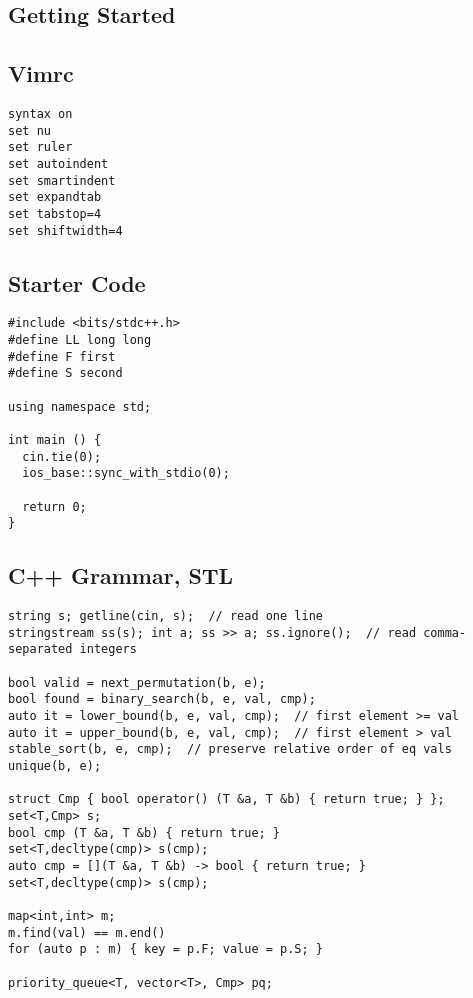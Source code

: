 \documentclass[10pt,landscape]{article}
\begin{document}
\begin{multicols}{2}

\setcounter{page}{1}
\pagestyle{fancy}
\tableofcontents
\newpage

\section{Getting Started}
\subsection{Vimrc}
\begin{lstlisting}
syntax on
set nu
set ruler
set autoindent
set smartindent
set expandtab
set tabstop=4
set shiftwidth=4
\end{lstlisting}
\subsection{Starter Code}
\begin{lstlisting}
#include <bits/stdc++.h>
#define LL long long
#define F first
#define S second

using namespace std;

int main () {
  cin.tie(0);
  ios_base::sync_with_stdio(0);
  
  return 0;
}
\end{lstlisting}
\subsection{C++ Grammar, STL}
\begin{lstlisting}
string s; getline(cin, s);  // read one line
stringstream ss(s); int a; ss >> a; ss.ignore();  // read comma-separated integers

bool valid = next_permutation(b, e);
bool found = binary_search(b, e, val, cmp);
auto it = lower_bound(b, e, val, cmp);  // first element >= val
auto it = upper_bound(b, e, val, cmp);  // first element > val
stable_sort(b, e, cmp);  // preserve relative order of eq vals
unique(b, e);

struct Cmp { bool operator() (T &a, T &b) { return true; } };
set<T,Cmp> s;
bool cmp (T &a, T &b) { return true; }
set<T,decltype(cmp)> s(cmp);
auto cmp = [](T &a, T &b) -> bool { return true; }
set<T,decltype(cmp)> s(cmp);

map<int,int> m;
m.find(val) == m.end()
for (auto p : m) { key = p.F; value = p.S; }

priority_queue<T, vector<T>, Cmp> pq;
\end{lstlisting}

\end{multicols}
\end{document}
